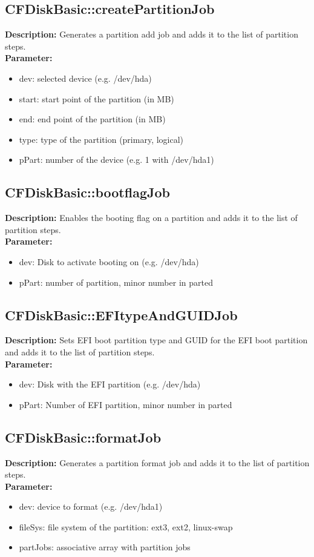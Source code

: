 \subsection{CFDiskBasic::createPartitionJob}
\textbf{Description:} Generates a partition add job and adds it to the list of partition steps.\\
\textbf{Parameter:}
\begin{itemize}
\item dev: selected device (e.g. /dev/hda)
\item start: start point of the partition (in MB)
\item end: end point of the partition (in MB)
\item type: type of the partition (primary, logical)
\item pPart: number of the device (e.g. 1 with /dev/hda1)
\end{itemize}

\subsection{CFDiskBasic::bootflagJob}
\textbf{Description:} Enables the booting flag on a partition and adds it to the list of partition steps.\\
\textbf{Parameter:}
\begin{itemize}
\item dev: Disk to activate booting on (e.g. /dev/hda)
\item pPart: number of partition, minor number in parted
\end{itemize}

\subsection{CFDiskBasic::EFItypeAndGUIDJob}
\textbf{Description:} Sets EFI boot partition type and GUID for the EFI boot partition and adds it to the list of partition steps.\\
\textbf{Parameter:}
\begin{itemize}
\item dev: Disk with the EFI partition (e.g. /dev/hda)
\item pPart: Number of EFI partition, minor number in parted
\end{itemize}

\subsection{CFDiskBasic::formatJob}
\textbf{Description:} Generates a partition format job and adds it to the list of partition steps.\\
\textbf{Parameter:}
\begin{itemize}
\item dev: device to format (e.g. /dev/hda1)
\item fileSys: file system of the partition: ext3, ext2, linux-swap
\item partJobs: associative array with partition jobs
\end{itemize}

